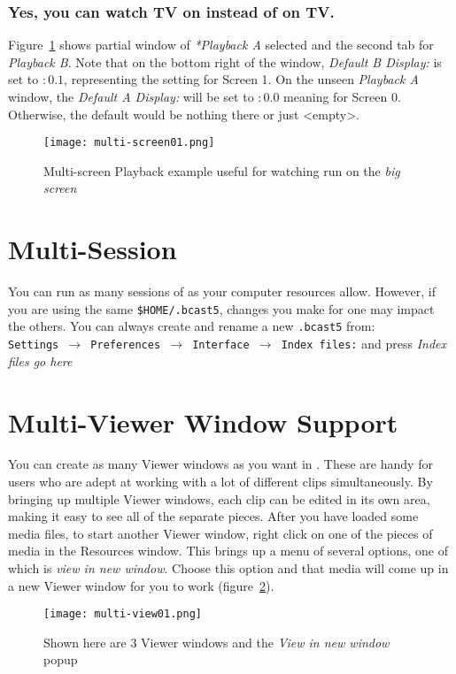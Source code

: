 \subsubsection*{Yes, you can watch TV on \CGG{} instead of \CGG{} on TV.}%
\label{ssub:watch_tv_on_cinelerra}

Figure~\ref{fig:multi-screen01} shows partial window of \textit{*Playback A} selected and the second tab for \textit{Playback B}.  Note that on the bottom right of the window, \textit{Default B Display:} is set to $:0.1$, representing the setting for Screen 1.  On the unseen \textit{Playback A} window, the \textit{Default A Display:} will be set to $:0.0$ meaning for Screen 0.  Otherwise, the default would be nothing there or just <empty>.

\begin{figure}[htpb]
    \centering
    \texttt{[image: multi-screen01.png]}
    \caption{Multi-screen Playback example useful for watching \CGG{} run on the \textit{big screen}}
    \label{fig:multi-screen01}
\end{figure}

\section{Multi-Session}%
\label{sec:multi_session}

You can run as many sessions of \CGG{} as your computer resources allow.  However, if you are using the same \texttt{\$HOME/.bcast5}, changes you make for one may impact the others. You can always create and rename a new \texttt{.bcast5} from:\\
\texttt{Settings $\rightarrow$ Preferences $\rightarrow$ Interface $\rightarrow$ Index files:} and press \textit{Index files go here}

\section{Multi-Viewer Window Support}%
\label{sec:multi_viewer_window_support}

You can create as many Viewer windows as you want in \CGG{}.  These are handy for users who are adept at working with a lot of different clips simultaneously.  By bringing up multiple Viewer windows, each clip can be edited in its own area, making it easy to see all of the separate pieces.  After you have loaded some media files, to start another Viewer window, right click on one of the pieces of media in the Resources window.  This brings up a menu of several options, one of which is \textit{view in new window}.  Choose this option and that media will come up in a new Viewer window for you to work (figure~\ref{fig:multi-view01}).

\begin{figure}[htpb]
    \centering
    \texttt{[image: multi-view01.png]}
    \caption{Shown here are 3 Viewer windows and the \textit{View in new window} popup}
    \label{fig:multi-view01}
\end{figure}

